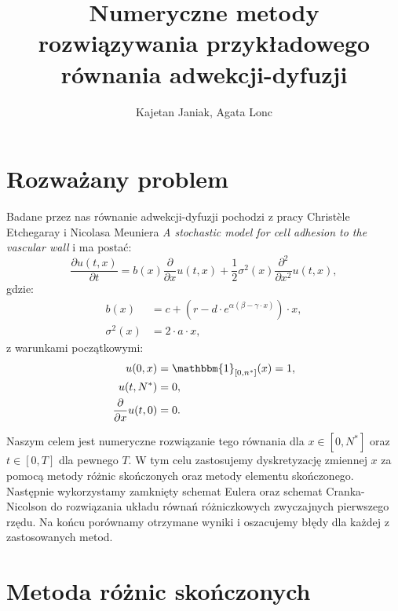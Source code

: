 \documentclass{article}
\title{Numeryczne metody rozwiązywania przykładowego równania adwekcji-dyfuzji}
\author{Kajetan Janiak, Agata Lonc}
\begin{document}
\maketitle
\section{Rozważany problem}
Badane przez nas równanie adwekcji-dyfuzji pochodzi z pracy Christèle Etchegaray i Nicolasa Meuniera \textit{A stochastic model for cell adhesion to the vascular wall} i ma postać:
\begin{equation}\label{rownanie}
\frac{\partial u(t, x)}{\partial t} = b(x) \frac{\partial}{\partial x} u(t, x) + \frac{1}{2} \sigma^{2}(x) \frac{\partial^{2}}{\partial {x}^{2}} u(t,x),
\end{equation}
gdzie:
\begin{align*}
b(x) &= c + (r - d\cdot e^{\alpha(\beta - \gamma \cdot x)})\cdot x, \\
\sigma^{2}(x) &= 2\cdot a \cdot x,
\end{align*}
z warunkami początkowymi:
\begin{align*}
u(0, x) &= \mathbbm{1}_{\lbrack 0, n^{*} \rbrack } (x) = 1, \\
u(t, N^{*}) &= 0, \\
\frac{\partial}{\partial x} u(t, 0) &= 0. 
\end{align*}

Naszym celem jest numeryczne rozwiązanie tego równania dla $x\in[0,N^{*}]$ oraz $t\in[0,T]$ dla pewnego $T$. W tym celu zastosujemy dyskretyzację zmiennej $x$ za pomocą metody różnic skończonych oraz metody elementu skończonego. Następnie wykorzystamy zamknięty schemat Eulera oraz schemat Cranka-Nicolson do rozwiązania układu równań różniczkowych zwyczajnych pierwszego rzędu. Na końcu porównamy otrzymane wyniki i oszacujemy błędy dla każdej z zastosowanych metod.




\section{Metoda różnic skończonych}
\end{document}

